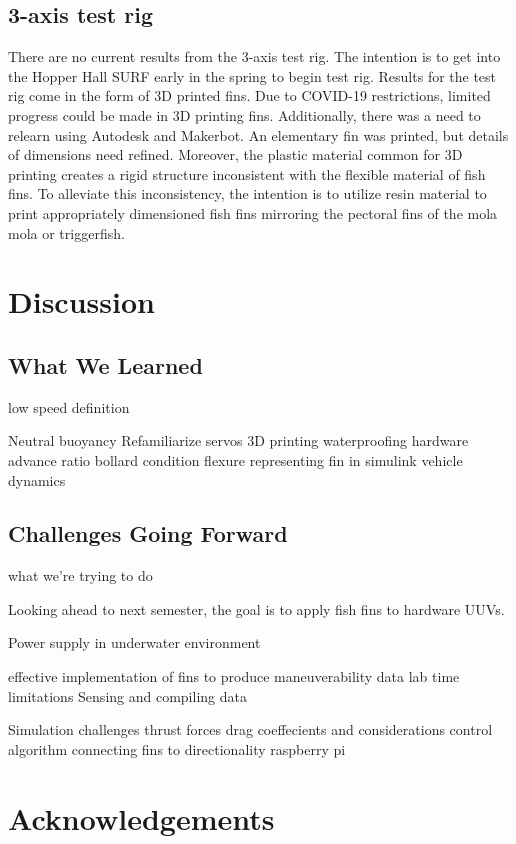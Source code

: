 \documentclass[twocolumn,10pt]{IEEEtran}
\begin{document}
\subsection{3-axis test rig}
There are no current results from the 3-axis test rig.  The intention is to get into the Hopper Hall SURF early in the spring to begin test rig.  Results for the test rig come in the form of 3D printed fins.  Due to COVID-19 restrictions, limited progress could be made in 3D printing fins.  Additionally, there was a need to relearn using Autodesk and Makerbot.  An elementary fin was printed, but details of dimensions need refined.  Moreover, the plastic material common for 3D printing creates a rigid structure inconsistent with the flexible material of fish fins.  To alleviate this inconsistency, the intention is to utilize resin material to print appropriately dimensioned fish fins mirroring the pectoral fins of the mola mola or triggerfish.

\section{Discussion}
\subsection{What We Learned}
low speed definition

Neutral buoyancy
Refamiliarize servos
3D printing
waterproofing hardware
advance ratio
bollard condition
flexure
representing fin in simulink
vehicle dynamics


\subsection{Challenges Going Forward}
what we're trying to do

Looking ahead to next semester, the goal is to apply fish fins to hardware UUVs.  

Power supply in underwater environment

effective implementation of fins to produce maneuverability data
lab time limitations
Sensing and compiling data

Simulation challenges
 thrust forces
 drag coeffecients and considerations
 control algorithm connecting fins to directionality
 raspberry pi
 
 
 


\section*{Acknowledgements}
\end{document}
